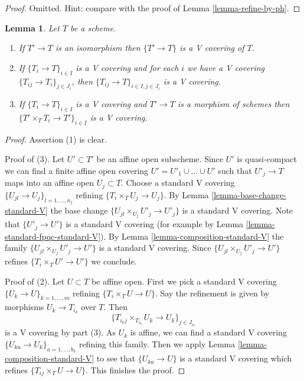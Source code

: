 \documentclass{stacks-project}
\theoremstyle{plain}
\newtheorem{lemma}[subsection]{Lemma}
\theoremstyle{definition}
\theoremstyle{remark}
\numberwithin{equation}{subsection}
\begin{document}
\begin{proof}
Omitted. Hint: compare with the proof of
Lemma \ref{lemma-refine-by-ph}.
\end{proof}

\begin{lemma}
\label{lemma-V}
Let $T$ be a scheme.
\begin{enumerate}
\item If $T' \to T$ is an isomorphism then $\{T' \to T\}$
is a V covering of $T$.
\item If $\{T_i \to T\}_{i\in I}$ is a V covering and for each
$i$ we have a V covering $\{T_{ij} \to T_i\}_{j\in J_i}$, then
$\{T_{ij} \to T\}_{i \in I, j\in J_i}$ is a V covering.
\item If $\{T_i \to T\}_{i\in I}$ is a V covering
and $T' \to T$ is a morphism of schemes then
$\{T' \times_T T_i \to T'\}_{i\in I}$ is a V covering.
\end{enumerate}
\end{lemma}

\begin{proof}
Assertion (1) is clear.

\medskip\noindent
Proof of (3).
Let $U' \subset T'$ be an affine open subscheme.
Since $U'$ is quasi-compact we can find a finite affine open
covering $U' = U'_1 \cup \ldots \cup U'$ such that
$U'_j \to T$ maps into an affine open $U_j \subset T$.
Choose a standard V covering $\{U_{jl} \to U_j\}_{l = 1, \ldots, n_j}$
refining $\{T_i \times_T U_j \to U_j\}$.
By Lemma \ref{lemma-base-change-standard-V}
the base change $\{U_{jl} \times_{U_j} U'_j \to U'_j\}$
is a standard V covering. Note that $\{U'_j \to U'\}$
is a standard V covering
(for example by Lemma \ref{lemma-standard-fpqc-standard-V}).
By Lemma \ref{lemma-composition-standard-V} 
the family $\{U_{jl} \times_{U_j} U'_j \to U'\}$
is a standard V covering. Since
$\{U_{jl} \times_{U_j} U'_j \to U'\}$ refines $\{T_i \times_T U' \to U'\}$
we conclude.

\medskip\noindent
Proof of (2).
Let $U \subset T$ be affine open. First we pick a standard V covering
$\{U_k \to U\}_{k = 1, \ldots, m}$ refining
$\{T_i \times_T U \to U\}$.
Say the refinement is given by morphisms $U_k \to T_{i_k}$ over $T$.
Then
$$
\{T_{i_kj} \times_{T_{i_k}} U_k \to U_k\}_{j \in J_{i_k}}
$$
is a V covering by part (3). As $U_k$ is affine,
we can find a standard V covering
$\{U_{ka} \to U_k\}_{a = 1, \ldots, b_k}$ refining this family.
Then we apply Lemma \ref{lemma-composition-standard-V}
to see that $\{U_{ka} \to U\}$ is a standard V covering which
refines $\{T_{ij} \times_T U \to U\}$. This finishes the proof.
\end{proof}
\end{document}
